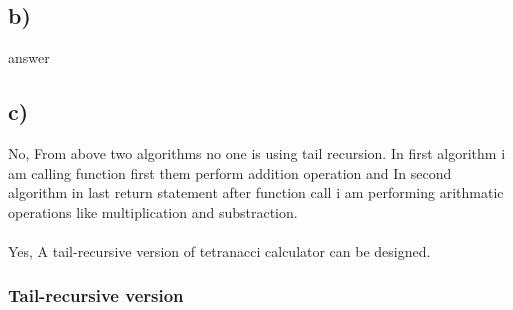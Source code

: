 \documentclass[10pt, a4paper]{article}
\begin{document}
    \subsection*{b)}
    answer
    \subsection*{c)}
    {No, From above two algorithms no one is using tail recursion. In first algorithm i am calling function first them perform addition operation and In second algorithm in last return statement after function call i am performing arithmatic operations like multiplication and substraction.\\\\}
    {Yes, A tail-recursive version of tetranacci calculator can be designed.}
    \subsubsection*{Tail-recursive version}
    
    
\end{document}
